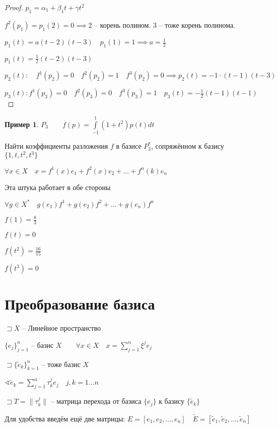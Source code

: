 \documentclass{book}
\newcommand{\tl}[1]{\widetilde{#1}}
\theoremstyle{definition}
\newtheorem*{example}{Пример}
\begin{document}
\begin{proof}
            $p_1 = \alpha_1+\beta_1t + \gamma t^2$

            $f^2(p_1) = p_1(2) = 0 \implies 2$ -- корень полином. 3 -- тоже корень полинома.

            $p_1(t) = a(t-2)(t-3)\quad p_1(1) = 1 \implies a = \frac{1}{2}$ 

            $p_1(t) = \frac{1}{2}(t-2)(t-3)$

            $p_2(t):\quad  f^1(p_2) = 0\quad f^2(p_2) = 1\quad f^3(p_2) = 0 \implies p_2(t) = -1\cdot (t-1)(t-3)$

            $p_3(t): f^1(p_3) = 0\quad f^2(p_3) = 0\quad f^3(p_3) = 1\quad p_3(t) = -\frac{1}{2}\left( t-1 \right) \left( t-1 \right) $
        \end{proof}

        \begin{example}
            $P_3\qquad f(p) = \int\limits_{-1}^1(1+t^2)p(t)dt$

            Найти коэффициенты разложения $f$ в базисе  $P_3^*$, сопряжённом к базису $\{1, t, t^2, t^3\}$

            $\forall x\in X\quad x = f^1(x)e_1 + f^2(x)e_2 + \ldots + f^n(k)e_n$

            Эта штука работает в обе стороны

            $\forall g\in X^*\quad g(e_1)f^1 + g(e_2)f^2 + \ldots + g(e_n)f^n$

            $f(1) = \frac{8}{3}$ 

            $f(t) = 0$

            $f(t^2) = \frac{16}{15}$ 

            $f(t^3) = 0$
        \end{example}
\section{Преобразование базиса}

$\sqsupset X$ -- Линейное пространство

$\{e_j\}_{j=1}^n$ -- базис  $X\qquad \forall x\in X\quad x = \sum_{j=1}^{n} \xi^je_j$ 

$\sqsupset \{\tl e_k\}_{k=1}^n$ -- тоже базис $X$

 $\sphericalangle \tl e_k = \sum_{j=1}^{n} \tau^j_ke_j\quad j, k = 1\ldots n$

 $\sqsupset T = \|\tau_k^j\|$ -- матрица перехода от базиса $\{e_j\}$ к базису  $\{\tl e_k\}$

 Для удобства введём ещё две матрицы:  $E = \left[ e_1, e_2, \ldots, e_n \right] \quad \tl E = \left[ \tl e_1, \tl e_2, \ldots, \tl e_n \right] $
\end{document}
